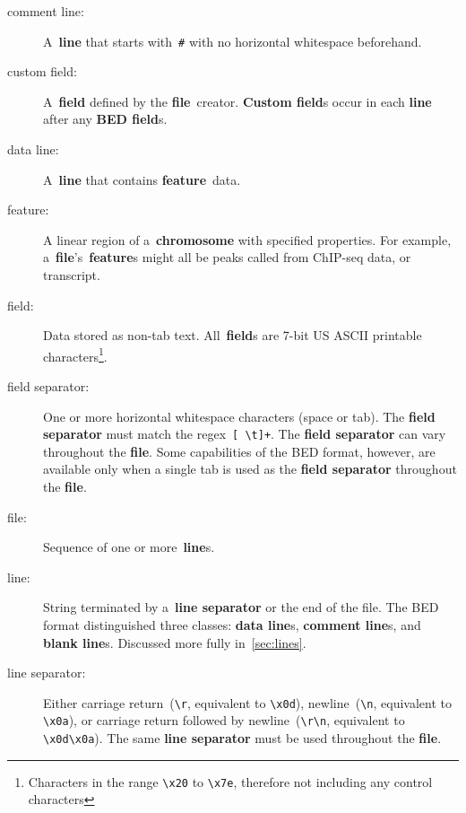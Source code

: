 \documentclass[11pt]{article}
\begin{document}
\begin{description}
\item[comment line:]
  A~\textbf{line} that starts with~\texttt{\#} with no horizontal whitespace beforehand.

\item[custom field:]
  A~\textbf{field} defined by the \textbf{file}~creator.
  \textbf{Custom field}s occur in each \textbf{line} after any \textbf{\acs{BED} field}s.

\item[data line:]
  A~\textbf{line} that contains \textbf{feature}~data.

\item[feature:]
  A linear region of a~\textbf{chromosome} with specified properties.
  For example, a~\textbf{file}'s~\textbf{feature}s might all be peaks called from ChIP-seq data, or transcript.

\item[field:]
  Data stored as non-tab text.
  All~\textbf{field}s are 7-bit US \ac{ASCII} printable characters\footnote{Characters in the range \texttt{{\textbackslash}x20} to \texttt{{\textbackslash}x7e}, therefore not including any control characters}.

\item[field separator:]
  One or more horizontal whitespace characters (space or tab).
  The \textbf{field separator} must match the \ac{regex}~\texttt{[ {\textbackslash}t]+}.
  The \textbf{field separator} can vary throughout the \textbf{file}.
  Some capabilities of the \ac{BED} format, however, are available only when a single tab is used as the \textbf{field separator} throughout the \textbf{file}.

\item[file:]
  Sequence of one or more~\textbf{line}s.

\item[line:]
  String terminated by a~\textbf{line separator} or the end of the file.
  The \ac{BED} format distinguished three classes: \textbf{data line}s, \textbf{comment line}s, and \textbf{blank line}s.
  Discussed more fully in~\autoref{sec:lines}.

\item[line separator:]
  Either carriage return~(\texttt{{\textbackslash}r}, equivalent to \texttt{{\textbackslash}x0d}), newline~(\texttt{{\textbackslash}n}, equivalent to \texttt{{\textbackslash}x0a}), or carriage return followed by newline~(\texttt{{\textbackslash}r{\textbackslash}n}, equivalent to \texttt{{\textbackslash}x0d{\textbackslash}x0a}).
  The same \textbf{line separator} must be used throughout the \textbf{file}.
\end{description}
\end{document}
